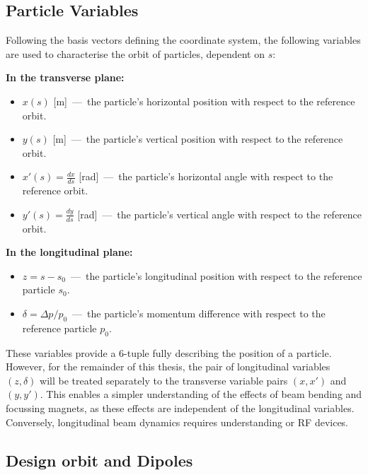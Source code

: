 \documentclass[11pt]{report}
\begin{document}
\subsection{Particle Variables}

Following the basis vectors defining the coordinate system, the following variables are used to characterise the orbit of particles, dependent on $s$:

\noindent \textbf{In the transverse plane:}
\begin{itemize}
  \item $x(s)$ [m]~---~the particle's horizontal position with respect to the reference orbit.
  \item $y(s)$ [m]~---~the particle's vertical position with respect to the reference orbit.
  \item $x'(s)=\frac{dx}{ds}$ [rad]~---~the particle's horizontal angle with respect to the reference orbit.
  \item $y'(s)=\frac{dy}{ds}$ [rad]~---~the particle's vertical angle with respect to the reference orbit.
\end{itemize}
\textbf{In the longitudinal plane:}
\begin{itemize}
    \item $z=s-s_0$~---~the particle's longitudinal position with respect to the reference particle $s_0$.
    \item $\delta = \Delta p/p_0$~---~the particle's momentum difference with respect to the reference particle $p_0$.
\end{itemize} 

These variables provide a 6-tuple fully describing the position of a particle. However, for the remainder of this thesis, the pair of longitudinal variables $(z, \delta)$ will be treated separately to the transverse variable pairs $(x, x')$ and $(y, y')$. This enables a simpler understanding of the effects of beam bending and focussing magnets, as these effects are independent of the longitudinal variables. Conversely, longitudinal beam dynamics requires understanding or RF devices.

\subsection{Design orbit and Dipoles}
\end{document}
